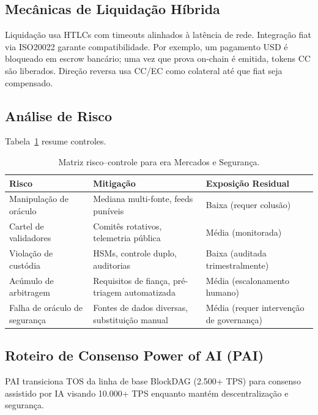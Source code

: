 \documentclass[11pt]{article}
\begin{document}
\subsection{Mecânicas de Liquidação Híbrida}
Liquidação usa HTLCs com timeouts alinhados à latência de rede. Integração fiat via ISO20022 garante compatibilidade. Por exemplo, um pagamento USD é bloqueado em escrow bancário; uma vez que prova on-chain é emitida, tokens CC são liberados. Direção reversa usa CC/EC como colateral até que fiat seja compensado.

\subsection{Análise de Risco}
Tabela~\ref{tab:risk-markets} resume controles.

\begin{table}[H]
  \centering
  \begin{tabular}{p{}p{}p{}}
    \toprule
    \textbf{Risco} & \textbf{Mitigação} & \textbf{Exposição Residual} \\
    \midrule
    Manipulação de oráculo & Mediana multi-fonte, feeds puníveis & Baixa (requer colusão) \\
    Cartel de validadores & Comitês rotativos, telemetria pública & Média (monitorada) \\
    Violação de custódia & HSMs, controle duplo, auditorias & Baixa (auditada trimestralmente) \\
    Acúmulo de arbitragem & Requisitos de fiança, pré-triagem automatizada & Média (escalonamento humano) \\
    Falha de oráculo de segurança & Fontes de dados diversas, substituição manual & Média (requer intervenção de governança) \\
    \bottomrule
  \end{tabular}
  \caption{Matriz risco--controle para era Mercados e Segurança.}
  \label{tab:risk-markets}
\end{table}

\subsection{Roteiro de Consenso Power of AI (PAI)}
\label{sec:pai-roadmap}
PAI transiciona TOS da linha de base BlockDAG (2.500+ TPS) para consenso assistido por IA visando 10.000+ TPS enquanto mantém descentralização e segurança.
\end{document}
